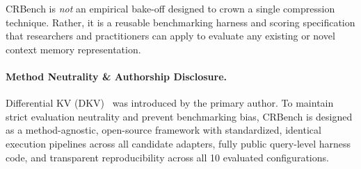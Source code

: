 \documentclass[11pt,a4paper]{article}
\begin{document}
CRBench is \textit{not} an empirical bake-off designed to crown a single compression technique. Rather, it is a reusable benchmarking harness and scoring specification that researchers and practitioners can apply to evaluate any existing or novel context memory representation.

\paragraph{Method Neutrality \& Authorship Disclosure.} Differential KV (DKV)~\cite{chimurkar2026differential} was introduced by the primary author. To maintain strict evaluation neutrality and prevent benchmarking bias, CRBench is designed as a method-agnostic, open-source framework with standardized, identical execution pipelines across all candidate adapters, fully public query-level harness code, and transparent reproducibility across all 10 evaluated configurations.
\end{document}
